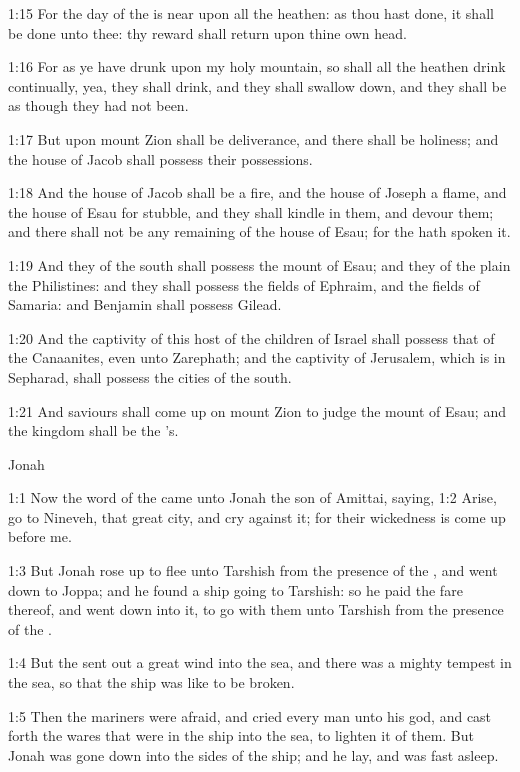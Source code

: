 1:15 For the day of the \LORD is near upon all the heathen: as thou hast done, it shall be done unto thee: thy reward shall return upon thine own head.

1:16 For as ye have drunk upon my holy mountain, so shall all the heathen drink continually, yea, they shall drink, and they shall swallow down, and they shall be as though they had not been.

1:17 But upon mount Zion shall be deliverance, and there shall be holiness; and the house of Jacob shall possess their possessions.

1:18 And the house of Jacob shall be a fire, and the house of Joseph a flame, and the house of Esau for stubble, and they shall kindle in them, and devour them; and there shall not be any remaining of the house of Esau; for the \LORD hath spoken it.

1:19 And they of the south shall possess the mount of Esau; and they of the plain the Philistines: and they shall possess the fields of Ephraim, and the fields of Samaria: and Benjamin shall possess Gilead.

1:20 And the captivity of this host of the children of Israel shall possess that of the Canaanites, even unto Zarephath; and the captivity of Jerusalem, which is in Sepharad, shall possess the cities of the south.

1:21 And saviours shall come up on mount Zion to judge the mount of Esau; and the kingdom shall be the \LORD's.




Jonah


1:1 Now the word of the \LORD came unto Jonah the son of Amittai, saying, 1:2 Arise, go to Nineveh, that great city, and cry against it; for their wickedness is come up before me.

1:3 But Jonah rose up to flee unto Tarshish from the presence of the \LORD, and went down to Joppa; and he found a ship going to Tarshish: so he paid the fare thereof, and went down into it, to go with them unto Tarshish from the presence of the \LORD.

1:4 But the \LORD sent out a great wind into the sea, and there was a mighty tempest in the sea, so that the ship was like to be broken.

1:5 Then the mariners were afraid, and cried every man unto his god, and cast forth the wares that were in the ship into the sea, to lighten it of them. But Jonah was gone down into the sides of the ship; and he lay, and was fast asleep.


